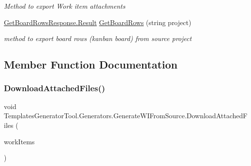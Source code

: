 \begin{DoxyCompactItemize}
\begin{DoxyCompactList}\small\item\em Method to export Work item attachments \end{DoxyCompactList}\item 
\mbox{\hyperlink{class_templates_generator_tool_1_1_view_model_1_1_get_board_rows_response_1_1_result}{Get\+Board\+Rows\+Response.\+Result}} \mbox{\hyperlink{class_templates_generator_tool_1_1_generators_1_1_generate_w_i_from_source_a07950971f3e02be2a376722ac76bf73a}{Get\+Board\+Rows}} (string project)
\begin{DoxyCompactList}\small\item\em method to export board rows (kanban board) from source project \end{DoxyCompactList}\end{DoxyCompactItemize}


\subsection{Member Function Documentation}
\mbox{\label{class_templates_generator_tool_1_1_generators_1_1_generate_w_i_from_source_a20c36bbbe10bb56f7f0472e8dd05b8bf}} 
\subsubsection{\texorpdfstring{Download\+Attached\+Files()}{DownloadAttachedFiles()}}
{\footnotesize\ttfamily void Templates\+Generator\+Tool.\+Generators.\+Generate\+W\+I\+From\+Source.\+Download\+Attached\+Files (\begin{DoxyParamCaption}\item[{\mbox{\hyperlink{class_templates_generator_tool_1_1_view_model_1_1_work_item_fetch_response_1_1_work_items}{Work\+Item\+Fetch\+Response.\+Work\+Items}}}]{work\+Items }\end{DoxyParamCaption})}



